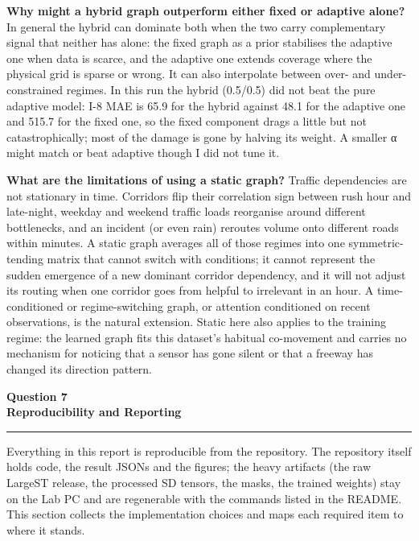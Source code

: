 \documentclass[11pt,letterpaper]{article}
\newcommand{\taskbanner}[2]{\begin{center}{\small\bfseries #1}\\[3pt]{\Large\bfseries #2}\end{center}\vspace{2pt}\hrule\vspace{8pt}}
\begin{document}
\textbf{Why might a hybrid graph outperform either fixed or adaptive alone?} In general the
hybrid can dominate both when the two carry complementary signal that neither has alone: the
fixed graph as a prior stabilises the adaptive one when data is scarce, and the adaptive
one extends coverage where the physical grid is sparse or wrong. It can also interpolate
between over- and under-constrained regimes. In this run the hybrid (0.5/0.5) did not beat
the pure adaptive model: I-8 MAE is 65.9 for the hybrid against 48.1 for the adaptive one
and 515.7 for the fixed one, so the fixed component drags a little but not catastrophically;
most of the damage is gone by halving its weight. A smaller α might match or beat adaptive though
I did not tune it.

\textbf{What are the limitations of using a static graph?} Traffic dependencies are not
stationary in time. Corridors flip their correlation sign between rush hour and late-night,
weekday and weekend traffic loads reorganise around different bottlenecks, and an incident
(or even rain) reroutes volume onto different roads within minutes. A static graph averages
all of those regimes into one symmetric-tending matrix that cannot switch with conditions;
it cannot represent the sudden emergence of a new dominant corridor dependency, and it will
not adjust its routing when one corridor goes from helpful to irrelevant in an hour. A
time-conditioned or regime-switching graph, or attention conditioned on recent observations,
is the natural extension. Static here also applies to the training regime: the learned graph
fits this dataset's habitual co-movement and carries no mechanism for noticing that a
sensor has gone silent or that a freeway has changed its direction pattern.

\taskbanner{Question 7}{Reproducibility and Reporting}

Everything in this report is reproducible from the repository. The repository itself
holds code, the result JSONs and the figures; the heavy artifacts (the raw LargeST
release, the processed SD tensors, the masks, the trained weights) stay on the Lab PC and
are regenerable with the commands listed in the README. This section collects the
implementation choices and maps each required item to where it stands.
\end{document}
